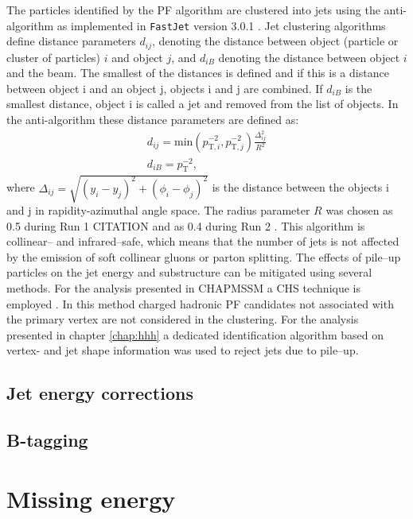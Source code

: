 The particles identified by the \ac{PF} algorithm
are clustered into jets using the anti-\kT algorithm \cite{antiKT} as implemented
in \texttt{FastJet} version 3.0.1 \cite{fastjet}. Jet clustering algorithms 
define distance parameters $d_{ij}$, denoting the distance between object (particle or cluster of 
particles) $i$ and 
object $j$, and $d_{iB}$ denoting the distance between 
object $i$ and the beam. The smallest of the distances
is defined and if this is a distance between object i and an object j, objects
i and j are combined. If $d_{iB}$ is the smallest distance, object i
is called a jet and removed from the list of objects. In the anti-\kT algorithm
these distance parameters are defined as:
\begin{align}\label{eqn:objects_antikt}
d_{ij}=\text{min}(p_{\text{T},i}^{-2},p_{\text{T},j}^{-2})\frac{\Delta_{ij}^2}{R^2}\\
d_{iB} = p_{\text{T}}^{-2},
\end{align}
where $\Delta_{ij} = \sqrt{(y_i-y_j)^2+(\phi_i - \phi_j)^2}$ is the distance
between the objects i and j in rapidity-azimuthal angle space. The radius
parameter $R$ was chosen as 0.5 during Run 1 CITATION and as 0.4 during Run 2 \cite{cms-jets-run2}. 
This algorithm is collinear-- and infrared--safe, which means that the number of jets
is not affected by the emission of soft collinear gluons or parton splitting. 
The effects of pile--up particles on the jet energy and substructure can be
mitigated using several methods. For the analysis presented in CHAPMSSM a
\ac{CHS} technique is employed \cite{cms-jets-run2}.  In this method
charged hadronic \ac{PF} candidates not associated with the primary vertex 
are not considered in the clustering. For the analysis presented in
chapter \ref{chap:hhh} a dedicated identification algorithm \cite{cms-jets-puid} 
based on vertex- and jet shape information was used to reject jets due to pile--up.

\subsection{Jet energy corrections}
\label{sec:objects_jets_jec}

\subsection{B-tagging}
\label{sec:objects_jets_btag}

\section{Missing energy}
\label{sec:objects_met}

